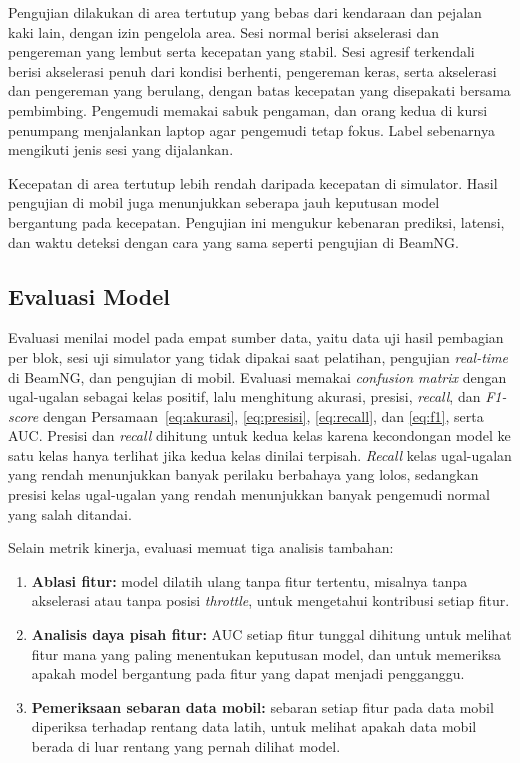 Pengujian dilakukan di area tertutup yang bebas dari kendaraan dan pejalan kaki lain, dengan izin pengelola area. Sesi normal berisi akselerasi dan pengereman yang lembut serta kecepatan yang stabil. Sesi agresif terkendali berisi akselerasi penuh dari kondisi berhenti, pengereman keras, serta akselerasi dan pengereman yang berulang, dengan batas kecepatan yang disepakati bersama pembimbing. Pengemudi memakai sabuk pengaman, dan orang kedua di kursi penumpang menjalankan laptop agar pengemudi tetap fokus. Label sebenarnya mengikuti jenis sesi yang dijalankan.

Kecepatan di area tertutup lebih rendah daripada kecepatan di simulator. Hasil pengujian di mobil juga menunjukkan seberapa jauh keputusan model bergantung pada kecepatan. Pengujian ini mengukur kebenaran prediksi, latensi, dan waktu deteksi dengan cara yang sama seperti pengujian di BeamNG.

\subsection{Evaluasi Model}
Evaluasi menilai model pada empat sumber data, yaitu data uji hasil pembagian per blok, sesi uji simulator yang tidak dipakai saat pelatihan, pengujian \textit{real-time} di BeamNG, dan pengujian di mobil. Evaluasi memakai \textit{confusion matrix} dengan ugal-ugalan sebagai kelas positif, lalu menghitung akurasi, presisi, \textit{recall}, dan \textit{F1-score} dengan Persamaan~\ref{eq:akurasi}, \ref{eq:presisi}, \ref{eq:recall}, dan \ref{eq:f1}, serta AUC. Presisi dan \textit{recall} dihitung untuk kedua kelas karena kecondongan model ke satu kelas hanya terlihat jika kedua kelas dinilai terpisah. \textit{Recall} kelas ugal-ugalan yang rendah menunjukkan banyak perilaku berbahaya yang lolos, sedangkan presisi kelas ugal-ugalan yang rendah menunjukkan banyak pengemudi normal yang salah ditandai.

Selain metrik kinerja, evaluasi memuat tiga analisis tambahan:
\begin{enumerate}
  \item \textbf{Ablasi fitur:} model dilatih ulang tanpa fitur tertentu, misalnya tanpa akselerasi atau tanpa posisi \textit{throttle}, untuk mengetahui kontribusi setiap fitur.
  \item \textbf{Analisis daya pisah fitur:} AUC setiap fitur tunggal dihitung untuk melihat fitur mana yang paling menentukan keputusan model, dan untuk memeriksa apakah model bergantung pada fitur yang dapat menjadi pengganggu.
  \item \textbf{Pemeriksaan sebaran data mobil:} sebaran setiap fitur pada data mobil diperiksa terhadap rentang data latih, untuk melihat apakah data mobil berada di luar rentang yang pernah dilihat model.
\end{enumerate}

